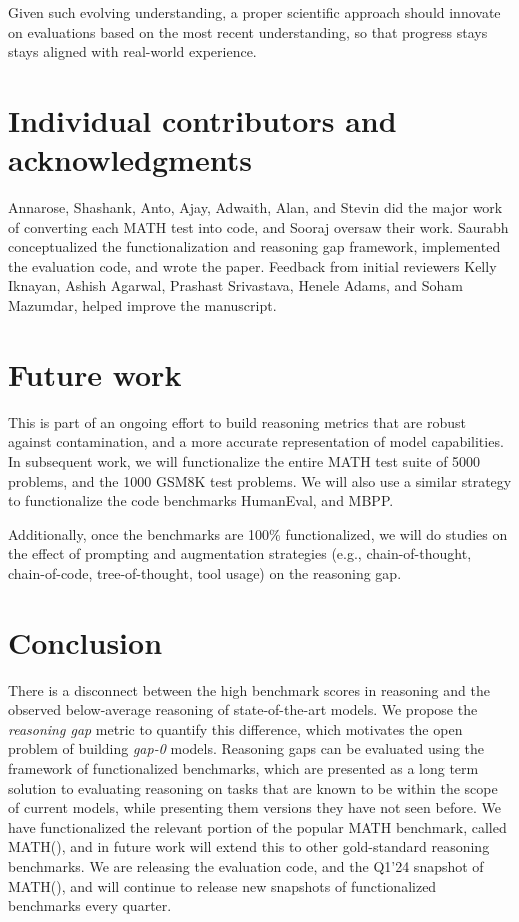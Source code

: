 \documentclass[11pt,a4paper]{article}
\begin{document}
Given such evolving understanding, a proper scientific approach should
innovate on evaluations based on the most recent understanding,
so that progress stays stays aligned with real-world experience.



\section{Individual contributors and acknowledgments}
Annarose, Shashank, Anto, Ajay, Adwaith, Alan, and Stevin did the major work of converting each
MATH test into code, and Sooraj oversaw their work.
%
Saurabh conceptualized the functionalization and reasoning gap framework,
implemented the evaluation code, and wrote the paper.
%
Feedback from initial reviewers Kelly Iknayan, Ashish Agarwal, Prashast
Srivastava, Henele Adams, and Soham Mazumdar, helped improve the manuscript.

\section{Future work}
This is part of an ongoing effort to build reasoning metrics that are robust against contamination, and a more accurate representation of model capabilities. In subsequent work, we will functionalize the entire MATH test suite of 5000 problems, and the 1000 GSM8K test problems. We will also use a similar strategy to functionalize the code benchmarks HumanEval, and MBPP.

Additionally, once the benchmarks are 100\% functionalized, we will do studies on the effect of prompting and augmentation strategies (e.g., chain-of-thought, chain-of-code, tree-of-thought, tool usage) on the reasoning gap.

\section{Conclusion}
There is a disconnect between the high benchmark scores in reasoning and the observed below-average reasoning of state-of-the-art models. We propose the {\em reasoning gap} metric to quantify this difference, which motivates the open problem of building {\em gap-0} models. Reasoning gaps can be evaluated using the framework of functionalized benchmarks, which are presented as a long term solution to evaluating reasoning on tasks that are known to be within the scope of current models, while presenting them versions they have not seen before. We have functionalized the relevant portion of the popular MATH benchmark, called MATH(), and in future work will extend this to other gold-standard reasoning benchmarks. We are releasing the evaluation code, and the Q1'24 snapshot of MATH(), and will continue to release new snapshots of functionalized benchmarks every quarter.
\end{document}
